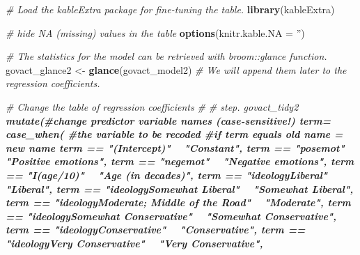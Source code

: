 \documentclass[doc,floatsintext]{apa6}
\newenvironment{Shaded}{\begin{snugshade}}{\end{snugshade}}
\newcommand{\KeywordTok}[1]{\textcolor[rgb]{0.13,0.29,0.53}{\textbf{#1}}}
\newcommand{\DataTypeTok}[1]{\textcolor[rgb]{0.13,0.29,0.53}{#1}}
\newcommand{\StringTok}[1]{\textcolor[rgb]{0.31,0.60,0.02}{#1}}
\newcommand{\CommentTok}[1]{\textcolor[rgb]{0.56,0.35,0.01}{\textit{#1}}}
\newcommand{\OperatorTok}[1]{\textcolor[rgb]{0.81,0.36,0.00}{\textbf{#1}}}
\newcommand{\NormalTok}[1]{#1}
\begin{document}
\begin{Shaded}
\begin{Highlighting}[]
\CommentTok{# Load the kableExtra package for fine-tuning the table.}
\KeywordTok{library}\NormalTok{(kableExtra)}

\CommentTok{# hide NA (missing) values in the table}
\KeywordTok{options}\NormalTok{(}\DataTypeTok{knitr.kable.NA =} \StringTok{''}\NormalTok{)}
 
\CommentTok{# The statistics for the model can be retrieved with broom::glance function.}
\NormalTok{govact_glance2 <-}\StringTok{ }\KeywordTok{glance}\NormalTok{(govact_model2)}
\CommentTok{# We will append them later to the regression coefficients.}

\CommentTok{# Change the table of regression coefficients}
\CommentTok{# %
\CommentTok{# step.}
\NormalTok{govact_tidy2 }\OperatorTok{%
\StringTok{  }\KeywordTok{mutate}\NormalTok{(}\CommentTok{#change predictor variable names (case-sensitive!)}
         \DataTypeTok{term=} \KeywordTok{case_when}\NormalTok{( }\CommentTok{#the variable to be recoded}
           \CommentTok{#if term equals old name = new name}
\NormalTok{           term }\OperatorTok{==}\StringTok{ "(Intercept)"} \OperatorTok{~}\StringTok{ "Constant"}\NormalTok{,}
\NormalTok{           term }\OperatorTok{==}\StringTok{ "posemot"} \OperatorTok{~}\StringTok{ "Positive emotions"}\NormalTok{,}
\NormalTok{           term }\OperatorTok{==}\StringTok{ "negemot"} \OperatorTok{~}\StringTok{ "Negative emotions"}\NormalTok{,}
\NormalTok{           term }\OperatorTok{==}\StringTok{ "I(age/10)"} \OperatorTok{~}\StringTok{ "Age (in decades)"}\NormalTok{,}
\NormalTok{           term }\OperatorTok{==}\StringTok{ "ideologyLiberal"} \OperatorTok{~}\StringTok{ "Liberal"}\NormalTok{,}
\NormalTok{           term }\OperatorTok{==}\StringTok{ "ideologySomewhat Liberal"} \OperatorTok{~}\StringTok{ "Somewhat Liberal"}\NormalTok{,}
\NormalTok{           term }\OperatorTok{==}\StringTok{ "ideologyModerate; Middle of the Road"} \OperatorTok{~}\StringTok{ "Moderate"}\NormalTok{,}
\NormalTok{           term }\OperatorTok{==}\StringTok{ "ideologySomewhat Conservative"} \OperatorTok{~}\StringTok{ "Somewhat Conservative"}\NormalTok{,}
\NormalTok{           term }\OperatorTok{==}\StringTok{ "ideologyConservative"} \OperatorTok{~}\StringTok{ "Conservative"}\NormalTok{,}
\NormalTok{           term }\OperatorTok{==}\StringTok{ "ideologyVery Conservative"} \OperatorTok{~}\StringTok{ "Very Conservative"}\NormalTok{,}
}}
\end{Highlighting}
\end{Shaded}
\end{document}
